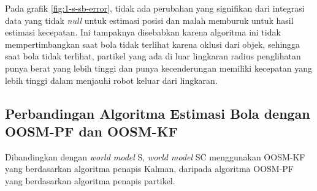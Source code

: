 Pada grafik \ref{fig:1-s-sb-error}, tidak ada perubahan yang signifikan dari integrasi data yang tidak \textit{null} untuk estimasi posisi dan malah memburuk untuk hasil estimasi kecepatan. Ini tampaknya disebabkan karena algoritma ini tidak mempertimbangkan saat bola tidak terlihat karena oklusi dari objek, sehingga saat bola tidak terlihat, partikel yang ada di luar lingkaran radius penglihatan punya berat yang lebih tinggi dan punya kecenderungan memiliki kecepatan yang lebih tinggi dalam menjauhi robot keluar dari lingkaran.

\subsection{Perbandingan Algoritma Estimasi Bola dengan OOSM-PF dan OOSM-KF}

Dibandingkan dengan \textit{world model} S, \textit{world model} SC menggunakan OOSM-KF yang berdasarkan algoritma penapis Kalman, daripada algoritma OOSM-PF yang berdasarkan algoritma penapis partikel.

